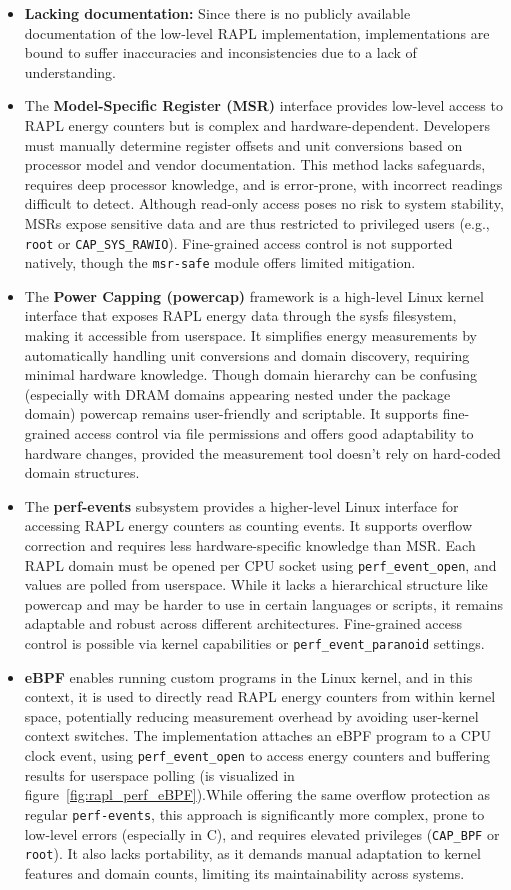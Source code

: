 \begin{itemize}
    \item \textbf{Lacking documentation: } Since there is no publicly available documentation of the low-level RAPL implementation, implementations are bound to suffer inaccuracies and inconsistencies due to a lack of understanding.
    \item The \textbf{Model-Specific Register (MSR)} interface provides low-level access to RAPL energy counters but is complex and hardware-dependent. Developers must manually determine register offsets and unit conversions based on processor model and vendor documentation. This method lacks safeguards, requires deep processor knowledge, and is error-prone, with incorrect readings difficult to detect. Although read-only access poses no risk to system stability, MSRs expose sensitive data and are thus restricted to privileged users (e.g., \texttt{root} or \texttt{CAP\_SYS\_RAWIO}). Fine-grained access control is not supported natively, though the \texttt{msr-safe} module offers limited mitigation.
    \item The \textbf{Power Capping (powercap)} framework is a high-level Linux kernel interface that exposes RAPL energy data through the sysfs filesystem, making it accessible from userspace. It simplifies energy measurements by automatically handling unit conversions and domain discovery, requiring minimal hardware knowledge. Though domain hierarchy can be confusing (especially with DRAM domains appearing nested under the package domain) powercap remains user-friendly and scriptable. It supports fine-grained access control via file permissions and offers good adaptability to hardware changes, provided the measurement tool doesn't rely on hard-coded domain structures.
    \item The \textbf{perf-events} subsystem provides a higher-level Linux interface for accessing RAPL energy counters as counting events. It supports overflow correction and requires less hardware-specific knowledge than MSR. Each RAPL domain must be opened per CPU socket using \texttt{perf\_event\_open}, and values are polled from userspace. While it lacks a hierarchical structure like powercap and may be harder to use in certain languages or scripts, it remains adaptable and robust across different architectures. Fine-grained access control is possible via kernel capabilities or \texttt{perf\_event\_paranoid} settings. 
    \item \textbf{eBPF} enables running custom programs in the Linux kernel, and in this context, it is used to directly read RAPL energy counters from within kernel space, potentially reducing measurement overhead by avoiding user-kernel context switches. The implementation attaches an eBPF program to a CPU clock event, using \texttt{perf\_event\_open} to access energy counters and buffering results for userspace polling (is visualized in figure~\ref{fig:rapl_perf_eBPF}).While offering the same overflow protection as regular \texttt{perf-events}, this approach is significantly more complex, prone to low-level errors (especially in C), and requires elevated privileges (\texttt{CAP\_BPF} or \texttt{root}). It also lacks portability, as it demands manual adaptation to kernel features and domain counts, limiting its maintainability across systems.

\end{itemize}
